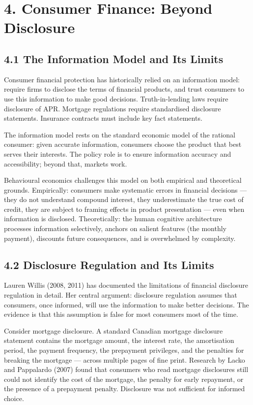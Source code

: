 \documentclass[12pt, letterpaper]{article}
\begin{document}
\medskip


\section{4. Consumer Finance: Beyond Disclosure}



\subsection{4.1 The Information Model and Its Limits}


Consumer financial protection has historically relied on an information model: require firms to disclose the terms of financial products, and trust consumers to use this information to make good decisions. Truth-in-lending laws require disclosure of APR. Mortgage regulations require standardised disclosure statements. Insurance contracts must include key fact statements.

The information model rests on the standard economic model of the rational consumer: given accurate information, consumers choose the product that best serves their interests. The policy role is to ensure information accuracy and accessibility; beyond that, markets work.

Behavioural economics challenges this model on both empirical and theoretical grounds. Empirically: consumers make systematic errors in financial decisions --- they do not understand compound interest, they underestimate the true cost of credit, they are subject to framing effects in product presentation --- even when information is disclosed. Theoretically: the human cognitive architecture processes information selectively, anchors on salient features (the monthly payment), discounts future consequences, and is overwhelmed by complexity.


\subsection{4.2 Disclosure Regulation and Its Limits}


Lauren Willis (2008, 2011) has documented the limitations of financial disclosure regulation in detail. Her central argument: disclosure regulation assumes that consumers, once informed, will use the information to make better decisions. The evidence is that this assumption is false for most consumers most of the time.

Consider mortgage disclosure. A standard Canadian mortgage disclosure statement contains the mortgage amount, the interest rate, the amortisation period, the payment frequency, the prepayment privileges, and the penalties for breaking the mortgage --- across multiple pages of fine print. Research by Lacko and Pappalardo (2007) found that consumers who read mortgage disclosures still could not identify the cost of the mortgage, the penalty for early repayment, or the presence of a prepayment penalty. Disclosure was not sufficient for informed choice.
\end{document}
